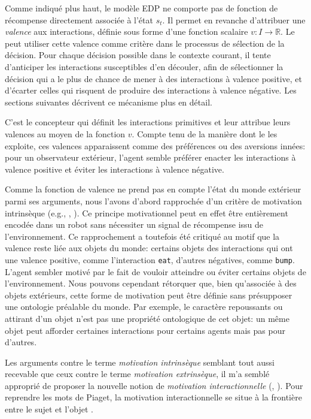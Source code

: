 \noindent
Comme indiqué plus haut, le modèle EDP ne comporte pas de fonction de récompense directement associée à l'état $s_t$.
Il permet en revanche d'attribuer une \emph{valence} aux interactions, définie sous forme d'une fonction scalaire $v: I \to \mathbb{R}$.
Le  peut utiliser cette valence comme critère dans le processus de sélection de la décision.
Pour chaque décision possible dans le contexte courant, il tente d'anticiper les interactions susceptibles d'en découler, afin de sélectionner la décision qui a le plus de chance de mener à des interactions à valence positive, et d'écarter celles qui risquent de produire des interactions à valence négative. 
Les sections suivantes décrivent ce mécanisme plus en détail.

C'est le concepteur qui définit les interactions primitives et leur attribue leurs valences au moyen de la fonction $v$.
Compte tenu de la manière dont le  les exploite, ces valences apparaissent comme des préférences ou des aversions innées:
pour un observateur extérieur, l'agent semble préférer enacter les interactions à valence positive et éviter les interactions à valence négative. 

Comme la fonction de valence ne prend pas en compte l'état du monde extérieur parmi ses arguments, nous l'avons d'abord rapprochée d'un critère de motivation intrinsèque (e.g., , \cite{georgeon_intrinsically-motivated_2012}). 
Ce principe motivationnel peut en effet être entièrement encodée dans un robot sans nécessiter un signal de récompense issu de l'environnement.
Ce rapprochement a toutefois été critiqué %
au motif que la valence reste liée aux objets du monde: certains objets  des interactions qui ont une valence positive, comme l'interaction \texttt{eat}, d'autres négatives, comme \texttt{bump}. 
L'agent sembler motivé par le fait de vouloir atteindre ou éviter certains objets de l'environnement.
Nous pouvons cependant rétorquer que, bien qu'associée à des objets extérieurs, cette forme de motivation peut être définie sans présupposer une ontologie préalable du monde. 
Par exemple, le caractère repoussants ou attirant d'un objet n'est pas une propriété ontologique de cet objet: un même objet peut afforder certaines interactions pour certains agents mais pas pour d'autres.

Les arguments contre le terme \emph{motivation intrinsèque} semblant tout aussi recevable que ceux contre le terme \emph{motivation extrinsèque}, il m'a semblé approprié de proposer la nouvelle notion de \emph{motivation interactionnelle} (, \cite{georgeon_interactional_2012}).
Pour reprendre les mots de Piaget, la motivation interactionnelle se situe \og à la frontière entre le sujet et l'objet \fg.

